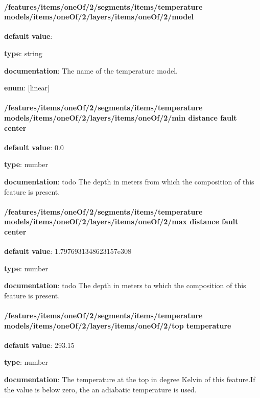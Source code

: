 \paragraph{/features/items/oneOf/2/segments/items/temperature models/items/oneOf/2/layers/items/oneOf/2/model} \begin{itemized}
\item {\bf default value}: 
\item {\bf type}: string
\item {\bf documentation}: The name of the temperature model.
\item {\bf enum}: [linear]\end{itemized}\paragraph{/features/items/oneOf/2/segments/items/temperature models/items/oneOf/2/layers/items/oneOf/2/min distance fault center} \begin{itemized}
\item {\bf default value}: 0.0
\item {\bf type}: number
\item {\bf documentation}: todo The depth in meters from which the composition of this feature is present.
\end{itemized}\paragraph{/features/items/oneOf/2/segments/items/temperature models/items/oneOf/2/layers/items/oneOf/2/max distance fault center} \begin{itemized}
\item {\bf default value}: 1.7976931348623157e308
\item {\bf type}: number
\item {\bf documentation}: todo The depth in meters to which the composition of this feature is present.
\end{itemized}\paragraph{/features/items/oneOf/2/segments/items/temperature models/items/oneOf/2/layers/items/oneOf/2/top temperature} \begin{itemized}
\item {\bf default value}: 293.15
\item {\bf type}: number
\item {\bf documentation}: The temperature at the top in degree Kelvin of this feature.If the value is below zero, the an adiabatic temperature is used.

\end{itemized}
